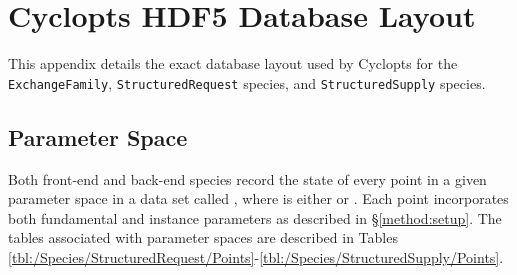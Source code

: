\chapter{Cyclopts HDF5 Database Layout}\label{app:hdf5}

This appendix details the exact database layout used by Cyclopts for the
\texttt{ExchangeFamily}, \texttt{StructuredRequest} species, and
\texttt{StructuredSupply} species.

\section{Parameter Space}

Both front-end and back-end species record the state of every point in a given
parameter space in a data set called ,
where  is either  or
. Each point incorporates both fundamental and instance
parameters as described in \S \ref{method:setup}. The tables associated with
parameter spaces are described in Tables
\ref{tbl:/Species/StructuredRequest/Points}-\ref{tbl:/Species/StructuredSupply/Points}.

